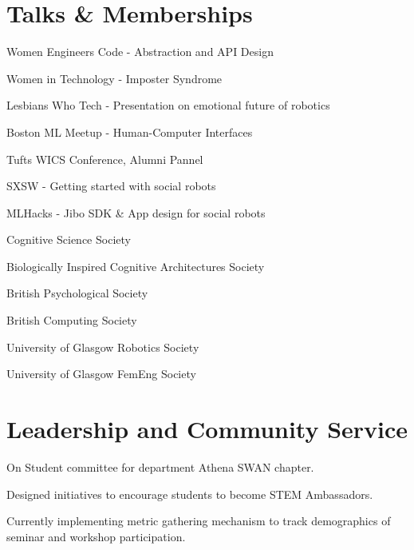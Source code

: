 \documentclass[]{csaund_resume-openfont}
\begin{document}
\section{Talks \& Memberships}
\descript {}
\begin{tightemize}
\item Women Engineers Code - Abstraction and API Design
\item Women in Technology - Imposter Syndrome
\item Lesbians Who Tech - Presentation on emotional future of robotics 
\item Boston ML Meetup - Human-Computer Interfaces
\item Tufts WICS Conference, Alumni Pannel 
\end{tightemize}
\sectionsep

\descript {}
\begin{tightemize}
\item SXSW - Getting started with social robots
\item MLHacks - Jibo SDK \& App design for social robots
\end{tightemize}
\sectionsep

\descript{ }
\begin{tightemize}
\item Cognitive Science Society
\item Biologically Inspired Cognitive Architectures Society
\item British Psychological Society
\item British Computing Society
\item University of Glasgow Robotics Society
\item University of Glasgow FemEng Society
\end{tightemize}
\sectionsep


\section{Leadership and Community Service}

\begin{tightemize}
\item On Student committee for department Athena SWAN chapter.
\item Designed initiatives to encourage students to become STEM Ambassadors.
\item Currently implementing metric gathering mechanism to track demographics of seminar and workshop participation.\end{tightemize}
\sectionsep
\end{document}
